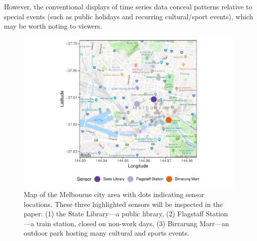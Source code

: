 \documentclass[12pt]{article}
\begin{document}
However, the conventional displays of time series data conceal patterns relative to special events (such as public holidays and recurring cultural/sport events), which may be worth noting to viewers.

\begin{figure}

{\centering \includegraphics[width=0.7\linewidth]{figure/ped-map-1} 

}

\caption{Map of the Melbourne city area with dots indicating sensor locations. These three highlighted sensors will be inspected in the paper: (1) the State Library---a public library, (2) Flagstaff Station---a train station, closed on non-work days, (3) Birrarung Marr---an outdoor park hosting many cultural and sports events.}\label{fig:ped-map}
\end{figure}
\end{document}

